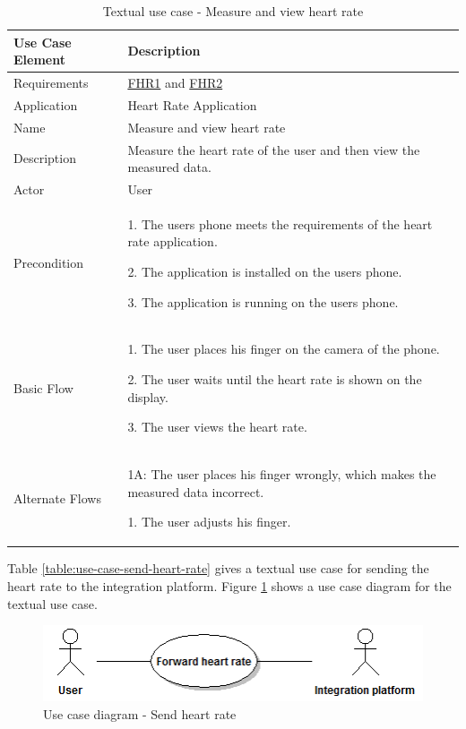 \begin{table}[H]
\begin{center}
\begin{tabular}{ l | p{10cm} }
  \hline
  \textbf{Use Case Element} & \textbf{Description} \\ \hline\hline
  Requirements & \hyperref[table:reqheartrate]{FHR1} and \hyperref[table:reqheartrate]{FHR2} \\ \hline
  Application & Heart Rate Application \\ \hline
  Name & Measure and view heart rate \\ \hline
  Description & Measure the heart rate of the user and then view the measured data. \\ \hline
  Actor & User \\ \hline
  Precondition &
    \par 1. The users phone meets the requirements of the heart rate application.
  	\par 2. The application is installed on the users phone.
  	\par 3. The application is running on the users phone.
  \\ \hline
  Basic Flow & 
  	\par 1. The user places his finger on the camera of the phone.
  	\par 2. The user waits until the heart rate is shown on the display.
  	\par 3. The user views the heart rate.
  \\ \hline
  Alternate Flows & 
  	\par 1A: The user places his finger wrongly, which makes the measured data incorrect.
  	\par\hspace{15pt} 1. The user adjusts his finger.
  \\ \hline
\end{tabular}
\end{center}
\caption{Textual use case - Measure and view heart rate}
\label{table:use-case-measure-heart-rate}
\end{table}

Table \ref{table:use-case-send-heart-rate} gives a textual use case for sending the heart rate to the integration platform.
Figure \ref{figure:use-case-diagram-send-heart-rate} shows a use case diagram for the textual use case.

\begin{figure}[H]
\centering
\includegraphics[scale=0.75]{../Figures/use-case-diagram-send-heart-rate.png}
\caption{Use case diagram - Send heart rate}
\label{figure:use-case-diagram-send-heart-rate}
\end{figure}

